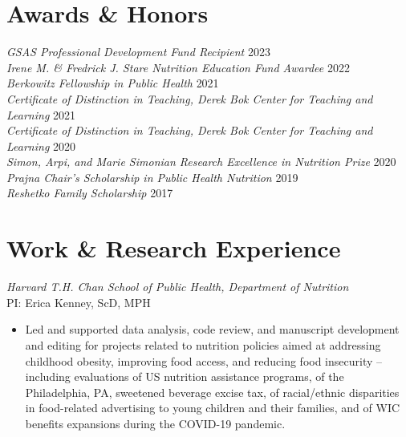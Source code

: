 \documentclass{cv_style}
\begin{document}
\section{Awards \& Honors}

\textit{GSAS Professional Development Fund Recipient} \hfill {2023}\\
\textit{Irene M. & Fredrick J. Stare Nutrition Education Fund Awardee} \hfill {2022}\\
\textit{Berkowitz Fellowship in Public Health} \hfill {2021}\\
\textit{Certificate of Distinction in Teaching, Derek Bok Center for Teaching and Learning} \hfill {2021}\\
\textit{Certificate of Distinction in Teaching, Derek Bok Center for Teaching and Learning} \hfill {2020}\\
\textit{Simon, Arpi, and Marie Simonian Research Excellence in Nutrition Prize} \hfill {2020} \\
\textit{Prajna Chair's Scholarship in Public Health Nutrition} \hfill 2019 \\
\textit{Reshetko Family Scholarship} \hfill 2017


\section{Work \& Research Experience}

\textit{Harvard T.H. Chan School of Public Health, Department of Nutrition} \\
PI: Erica Kenney, ScD, MPH
\begin{itemize}
    \item Led and supported data analysis, code review, and manuscript development and editing for projects related to nutrition policies aimed at addressing childhood obesity, improving food access, and reducing food insecurity -- including evaluations of US nutrition assistance programs, of the Philadelphia, PA, sweetened beverage excise tax, of racial/ethnic disparities in food-related advertising to young children and their families, and of WIC benefits expansions during the COVID-19 pandemic.
\end{itemize}
\end{document}
